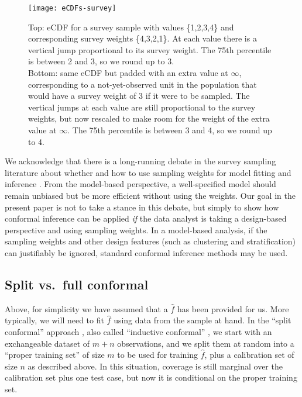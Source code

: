\documentclass[10.5pt, letterpaper]{article}
\numberwithin{table}{section}
\numberwithin{figure}{section}
\numberwithin{equation}{section}
\begin{document}
\begin{figure}[h!]
\texttt{[image: eCDFs-survey]}
\centering
\caption{Top: eCDF for a survey sample with values \{1,2,3,4\} and corresponding survey weights \{4,3,2,1\}. At each value there is a vertical jump proportional to its survey weight. The 75th percentile is between 2 and 3, so we round up to 3. \\ Bottom: same eCDF but padded with an extra value at $\infty$, corresponding to a not-yet-observed unit in the population that would have a survey weight of 3 if it were to be sampled. The vertical jumps at each value are still proportional to the survey weights, but now rescaled to make room for the weight of the extra value at $\infty$. The 75th percentile is between 3 and 4, so we round up to 4.}
\label{fig:eCDFs-survey}
\end{figure}

We acknowledge that there is a long-running debate in the survey sampling literature about whether and how to use sampling weights for model fitting and inference \citep{pfeffermann1993role, fienberg2010relevance, lumley2017fitting}. From the model-based perspective, a well-specified model should remain unbiased but be more efficient without using the weights. Our goal in the present paper is not to take a stance in this debate, but simply to show how conformal inference can be applied \emph{if} the data analyst is taking a design-based perspective and using sampling weights. In a model-based analysis, if the sampling weights and other design features (such as clustering and stratification) can justifiably be ignored, standard conformal inference methods may be used.








\subsection{Split vs.\ full conformal}\label{sec:SplitFull}

Above, for simplicity we have assumed that a $\hat f$ has been provided for us. More typically, we will need to fit $\hat f$ using data from the sample at hand. In the ``split conformal'' approach \citep{lei2018distribution}, also called ``inductive conformal'' \citep{papadopoulos2002inductive}, we start with an exchangeable dataset of $m+n$ observations, and we split them at random into a ``proper training set'' of size $m$ to be used for training $\hat f$, plus a calibration set of size $n$ as described above. In this situation, coverage is still marginal over the calibration set plus one test case, but now it is conditional on the proper training set.
\end{document}
